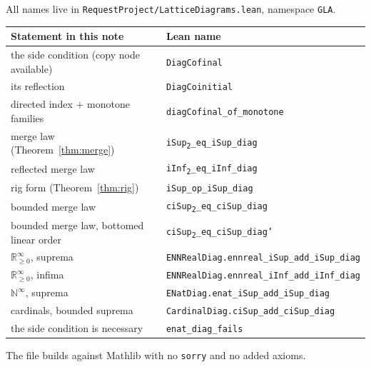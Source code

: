\documentclass[11pt,a4paper]{article}
\newcommand{\lean}[1]{\texttt{\small #1}}
\newcommand{\Rzi}{\mathbb{R}_{\geq 0}^{\infty}}
\newcommand{\Ninf}{\mathbb{N}^{\infty}}
\theoremstyle{definition}
\theoremstyle{plain}
\theoremstyle{remark}
\begin{document}
All names live in \lean{RequestProject/LatticeDiagrams.lean}, namespace
\lean{GLA}.

\begin{center}
\renewcommand{\arraystretch}{1.35}
\begin{tabular}{@{}ll@{}}
\toprule
\textbf{Statement in this note} & \textbf{Lean name}\\
\midrule
the side condition (copy node available)   & \lean{DiagCofinal}\\
its reflection                             & \lean{DiagCoinitial}\\
directed index $+$ monotone families       & \lean{diagCofinal\_of\_monotone}\\
merge law (Theorem~\ref{thm:merge})        & \lean{iSup\textsubscript{2}\_eq\_iSup\_diag}\\
reflected merge law                        & \lean{iInf\textsubscript{2}\_eq\_iInf\_diag}\\
rig form (Theorem~\ref{thm:rig})           & \lean{iSup\_op\_iSup\_diag}\\
bounded merge law                          & \lean{ciSup\textsubscript{2}\_eq\_ciSup\_diag}\\
bounded merge law, bottomed linear order   & \lean{ciSup\textsubscript{2}\_eq\_ciSup\_diag'}\\
$\Rzi$, suprema                            & \lean{ENNRealDiag.ennreal\_iSup\_add\_iSup\_diag}\\
$\Rzi$, infima                             & \lean{ENNRealDiag.ennreal\_iInf\_add\_iInf\_diag}\\
$\Ninf$, suprema                           & \lean{ENatDiag.enat\_iSup\_add\_iSup\_diag}\\
cardinals, bounded suprema                 & \lean{CardinalDiag.ciSup\_add\_ciSup\_diag}\\
the side condition is necessary            & \lean{enat\_diag\_fails}\\
\bottomrule
\end{tabular}
\end{center}

\medskip
\noindent
The file builds against Mathlib with no \lean{sorry} and no added axioms.
\end{document}
